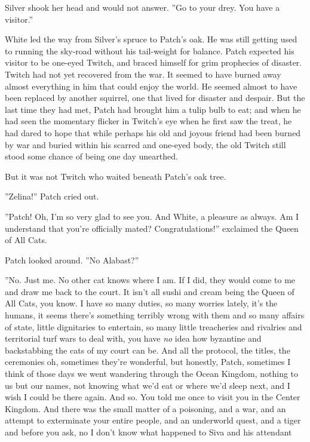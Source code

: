 \documentclass[11pt]{article}
\begin{document}
 Silver shook her head and would not answer. ''Go to your drey. You have a visitor.''\par
 White led the way from Silver's spruce to Patch's oak. He was still getting used to running the sky-road without his tail-weight for balance. Patch expected his visitor to be one-eyed Twitch, and braced himself for grim prophecies of disaster. Twitch had not yet recovered from the war. It seemed to have burned away almost everything in him that could enjoy the world. He seemed almost to have been replaced by another squirrel, one that lived for disaster and despair. But the last time they had met, Patch had brought him a tulip bulb to eat; and when he had seen the momentary flicker in Twitch's eye when he first saw the treat, he had dared to hope that while perhaps his old and joyous friend had been burned by war and buried within his scarred and one-eyed body, the old Twitch still stood some chance of being one day unearthed.\par
 But it was not Twitch who waited beneath Patch's oak tree.\par
 ''Zelina!'' Patch cried out.\par
 ''Patch! Oh, I'm so very glad to see you. And White, a pleasure as always. Am I understand that you're officially mated? Congratulations!'' exclaimed the Queen of All Cats.\par
 Patch looked around. ''No Alabast?''\par
 ''No. Just me. No other cat knows where I am. If I did, they would come to me and draw me back to the court. It isn't all sushi and cream being the Queen of All Cats, you know. I have so many duties, so many worries %
 lately, it's the humans, it seems there's something terribly wrong with them %
 and so many affairs of state, little dignitaries to entertain, so many little treacheries and rivalries and territorial turf wars to deal with, you have {\it no} idea how byzantine and backstabbing the cats of my court can be. And all the protocol, the titles, the ceremonies %
 oh, sometimes they're wonderful, but honestly, Patch, sometimes I think of those days we went wandering through the Ocean Kingdom, nothing to us but our names, not knowing what we'd eat or where we'd sleep next, and I wish I could be there again. And so. You told me once to visit you in the Center Kingdom. And there was the small matter of a poisoning, and a war, and an attempt to exterminate your entire people, and an underworld quest, and a tiger %
 and before you ask, no I don't know what happened to Siva and his attendant %
\end{document}
